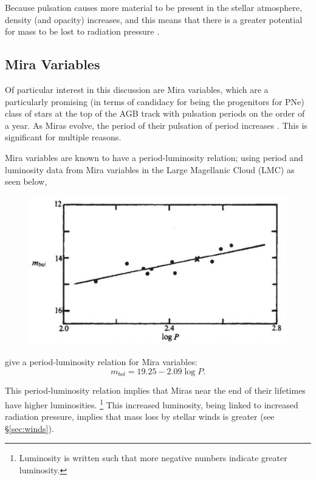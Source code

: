 \documentclass[twocolumn]{aastex63}
\begin{document}
Because pulsation causes more material to be present in the stellar atmosphere, density (and opacity) increases, and this means that there is a greater potential for mass to be lost to radiation pressure \citep{liljegren}. 

\subsection{Mira Variables} \label{subsec:mira}

Of particular interest in this discussion are Mira variables, which are a particularly promising (in terms of candidacy for being the progenitors for PNe) class of stars at the top of the AGB track with pulsation periods on the order of a year. As Miras evolve, the period of their pulsation of period increases \citep{fadeyev}. This is significant for multiple reasons. 

Mira variables are known to have a period-luminosity relation; using period and luminosity data from Mira variables in the Large Magellanic Cloud (LMC) as seen below,

\begin{figure}[ht]
    \includegraphics[width=\textwidth]{period_luminosity.png}
\end{figure}

\cite{glass} give a period-luminosity relation for Mira variables: 
\begin{equation*}
    m_{bol} = 19.25 - 2.09\log P.
\end{equation*}

This period-luminosity relation implies that Miras near the end of their lifetimes have higher luminosities. \footnote{Luminosity is written such that more negative numbers indicate greater luminosity.} This increased luminosity, being linked to increased radiation pressure, implies that mass loss by stellar winds is greater (see \S \ref{sec:winds}). 
\end{document}
